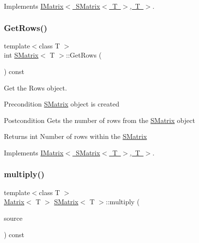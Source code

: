 Implements \mbox{\hyperlink{class_i_matrix_a3b84da3898ef38bdf281c13f218fc278}{I\+Matrix$<$ S\+Matrix$<$ T $>$, T $>$}}.

\mbox{\label{class_s_matrix_ae118c3b246ed5418eadd8f687ec449e2}} 
\subsubsection{\texorpdfstring{GetRows()}{GetRows()}}
{\footnotesize\ttfamily template$<$class T $>$ \\
int \mbox{\hyperlink{class_s_matrix}{S\+Matrix}}$<$ T $>$\+::Get\+Rows (\begin{DoxyParamCaption}{ }\end{DoxyParamCaption}) const\hspace{0.3cm}{\ttfamily [virtual]}}



Get the Rows object. 

\begin{DoxyPrecond}{Precondition}
\mbox{\hyperlink{class_s_matrix}{S\+Matrix}} object is created 
\end{DoxyPrecond}
\begin{DoxyPostcond}{Postcondition}
Gets the number of rows from the \mbox{\hyperlink{class_s_matrix}{S\+Matrix}} object 
\end{DoxyPostcond}
\begin{DoxyReturn}{Returns}
int Number of rows within the \mbox{\hyperlink{class_s_matrix}{S\+Matrix}} 
\end{DoxyReturn}


Implements \mbox{\hyperlink{class_i_matrix_a58632b018f4023768db7963e22f468da}{I\+Matrix$<$ S\+Matrix$<$ T $>$, T $>$}}.

\mbox{\label{class_s_matrix_a33fad429abe7b78533b909cce648722d}} 
\subsubsection{\texorpdfstring{multiply()}{multiply()}\hspace{0.1cm}{\footnotesize\ttfamily [1/6]}}
{\footnotesize\ttfamily template$<$class T $>$ \\
\mbox{\hyperlink{class_matrix}{Matrix}}$<$ T $>$ \mbox{\hyperlink{class_s_matrix}{S\+Matrix}}$<$ T $>$\+::multiply (\begin{DoxyParamCaption}\item[{const \mbox{\hyperlink{class_i_matrix}{I\+Matrix}}$<$ \mbox{\hyperlink{class_matrix}{Matrix}}$<$ T $>$, T $>$ \&}]{source }\end{DoxyParamCaption}) const}



